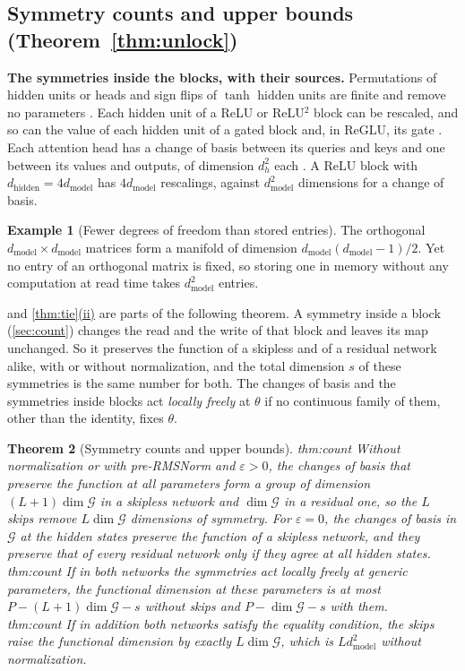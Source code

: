\documentclass[10pt]{article}
\newtheorem{theorem}{Theorem}[section]
\theoremstyle{definition}
\newtheorem{example}[theorem]{Example}
\theoremstyle{remark}
\newcommand{\dm}{d_{\mathrm{model}}}
\newcommand{\dhid}{d_{\mathrm{hidden}}}
\newcommand{\G}{\mathcal{G}}
\newcommand{\para}[1]{\smallskip\noindent\textbf{#1}\hspace{0.5em}}
\newcommand{\ptlabel}[1]{\phantomsection\label{#1}}
\DeclareRobustCommand{\cpref}[2]{\hyperref[#1:#2]{\cref*{#1}(#2)}}
\newcommand{\stpart}[3]{\ifx\relax#1\relax\else\ptlabel{#1:#2}\fi{\upshape\bfseries\boldmath(#2)\ifx\relax#3\relax\else\ #3.\fi}}
\begin{document}
\subsection{Symmetry counts and upper bounds\texorpdfstring{ (Theorem~\ref*{thm:unlock})}{}}\label{app:prf-count}

\para{The symmetries inside the blocks, with their sources.} Permutations of hidden units or heads and sign flips of $\tanh$ hidden units are finite and remove no parameters \citep{hechtnielsen1989theory,sussmann1992,fefferman1994}. Each hidden unit of a ReLU or ReLU$^2$ block can be rescaled, and so can the value of each hidden unit of a gated block and, in ReGLU, its gate \citep{rolnick2020reverse,godfrey2022symmetries}. Each attention head has a change of basis between its queries and keys and one between its values and outputs, of dimension $d_h^2$ each \citep{elhage2021circuits,tran2025equivariant,wang2025gauge,theus2025glmc}. A ReLU block with $\dhid = 4\dm$ has $4\dm$ rescalings, against $\dm^2$ dimensions for a change of basis.

\begin{example}[Fewer degrees of freedom than stored entries]\label{ex:orth}
The orthogonal $\dm\times\dm$ matrices form a manifold of dimension $\dm(\dm-1)/2$. Yet no entry of an orthogonal matrix is fixed, so storing one in memory without any computation at read time takes $\dm^2$ entries.
\end{example}

 and \cpref{thm:tie}{ii} are parts of the following theorem. A symmetry inside a block (\cref{sec:count}) changes the read and the write of that block and leaves its map unchanged. So it preserves the function of a skipless and of a residual network alike, with or without normalization, and the total dimension $s$ of these symmetries is the same number for both. The changes of basis and the symmetries inside blocks act \emph{locally freely} at $\theta$ if no continuous family of them, other than the identity, fixes $\theta$.
\begin{theorem}[Symmetry counts and upper bounds]\label{thm:count}
\stpart{thm:count}{i}{} Without normalization or with pre-RMSNorm and $\varepsilon > 0$, the changes of basis that preserve the function at all parameters form a group of dimension $(L+1)\dim\G$ in a skipless network and $\dim\G$ in a residual one, so the $L$ skips remove $L\dim\G$ dimensions of symmetry. For $\varepsilon = 0$, the changes of basis in $\G$ at the hidden states preserve the function of a skipless network, and they preserve that of every residual network only if they agree at all hidden states.\\
\stpart{thm:count}{ii}{} If in both networks the symmetries act locally freely at generic parameters, the functional dimension at these parameters is at most $P - (L+1)\dim\G - s$ without skips and $P - \dim\G - s$ with them.\\
\stpart{thm:count}{iii}{} If in addition both networks satisfy the equality condition, the skips raise the functional dimension by exactly $L\dim\G$, which is $L\dm^2$ without normalization.
\end{theorem}
\end{document}

